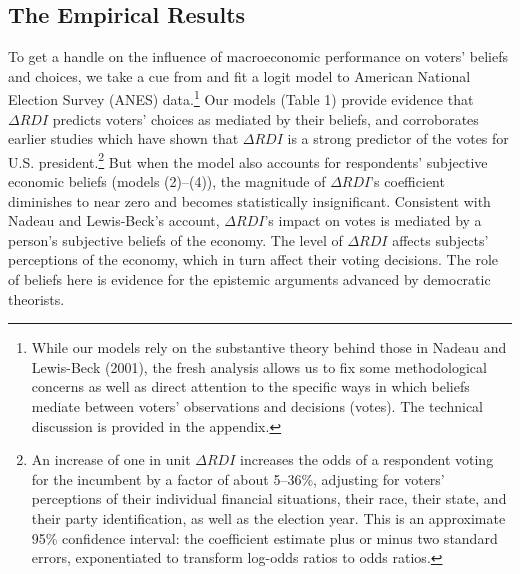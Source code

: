 \documentclass[11pt]{article}
\begin{document}
\subsection{The Empirical Results}\label{sec:model}
To get a handle on the influence of macroeconomic performance on voters' beliefs and choices, we take a cue from \citet{Nadeau:2001tw} and fit a logit model to American National Election Survey (ANES) data.\footnote{While
our models rely on the substantive theory behind those in Nadeau and Lewis-Beck (2001), the fresh analysis allows us to fix some methodological concerns as well as direct attention to the specific ways in which beliefs mediate between voters' observations and decisions (votes). The technical discussion is provided in the appendix.} Our models (Table 1) provide evidence that $\Delta RDI$ predicts voters' choices as mediated by their beliefs, and corroborates earlier studies which have shown that $\Delta RDI$  is a strong predictor of the votes for U.S. president.\footnote{An increase of one in unit $\Delta RDI$ increases the odds of a respondent voting for the incumbent by a factor of about 5--36\%, adjusting for voters' perceptions of their individual financial situations, their race, their state, and their party identification, as well as the election year. This is an approximate 95\% confidence interval: the coefficient estimate plus or minus two standard errors, exponentiated to transform log-odds ratios to odds ratios.} But when the model also accounts for respondents' subjective  economic beliefs (models (2)--(4)), the magnitude of $\Delta RDI$'s coefficient diminishes to near zero and becomes statistically insignificant. Consistent with Nadeau and Lewis-Beck's account, $\Delta RDI$'s impact on votes is mediated by a person's subjective beliefs of the economy. The level of $\Delta RDI$ affects subjects' perceptions of the economy, which in turn affect their voting decisions. The role of beliefs here is evidence for the epistemic arguments advanced by democratic theorists. %
\end{document}
